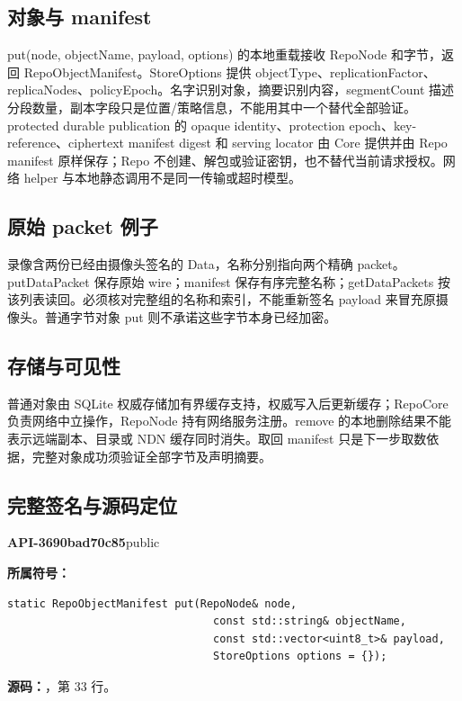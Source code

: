 \subsection{对象与 manifest}
put(node, objectName, payload, options) 的本地重载接收 RepoNode 和字节，返回 RepoObjectManifest。StoreOptions 提供 objectType、replicationFactor、replicaNodes、policyEpoch。名字识别对象，摘要识别内容，segmentCount 描述分段数量，副本字段只是位置/策略信息，不能用其中一个替代全部验证。protected durable publication 的 opaque identity、protection epoch、key-reference、ciphertext manifest digest 和 serving locator 由 Core 提供并由 Repo manifest 原样保存；Repo 不创建、解包或验证密钥，也不替代当前请求授权。网络 helper 与本地静态调用不是同一传输或超时模型。

\subsection{原始 packet 例子}
录像含两份已经由摄像头签名的 Data，名称分别指向两个精确 packet。putDataPacket 保存原始 wire；manifest 保存有序完整名称；getDataPackets 按该列表读回。必须核对完整组的名称和索引，不能重新签名 payload 来冒充原摄像头。普通字节对象 put 则不承诺这些字节本身已经加密。

\subsection{存储与可见性}
普通对象由 SQLite 权威存储加有界缓存支持，权威写入后更新缓存；RepoCore 负责网络中立操作，RepoNode 持有网络服务注册。remove 的本地删除结果不能表示远端副本、目录或 NDN 缓存同时消失。取回 manifest 只是下一步取数依据，完整对象成功须验证全部字节及声明摘要。

\subsection{完整签名与源码定位}

\textbf{API-3690bad70c85}\quad public\par
\textbf{所属符号：}\par
\begin{Verbatim}[fontsize=\footnotesize,breaklines,breakanywhere]
static RepoObjectManifest put(RepoNode& node,
                                const std::string& objectName,
                                const std::vector<uint8_t>& payload,
                                StoreOptions options = {});
\end{Verbatim}
\textbf{源码：}，第 33 行。\par

